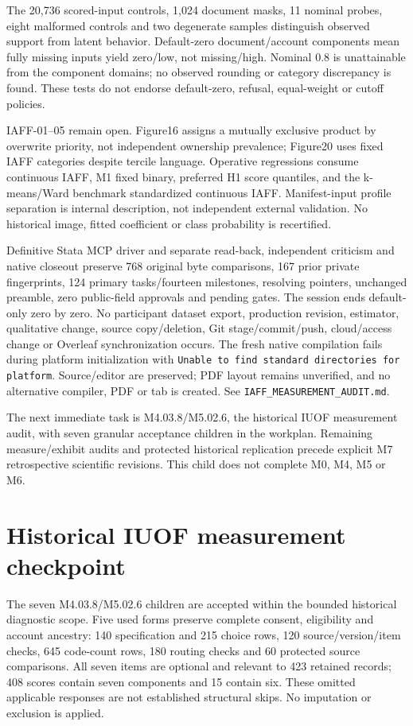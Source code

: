 \documentclass[11pt,a4paper]{article}
\begin{document}
The 20,736 scored-input controls, 1,024 document masks, 11 nominal probes,
eight malformed controls and two degenerate samples distinguish observed
support from latent behavior. Default-zero document/account components mean
fully missing inputs yield zero/low, not missing/high. Nominal 0.8 is
unattainable from the component domains; no observed rounding or category
discrepancy is found. These tests do not endorse default-zero, refusal,
equal-weight or cutoff policies.

IAFF-01--05 remain open. Figure16 assigns a mutually exclusive product by
overwrite priority, not independent ownership prevalence; Figure20 uses fixed
IAFF categories despite tercile language. Operative regressions consume
continuous IAFF, M1 fixed binary, preferred H1 score quantiles, and the
k-means/Ward benchmark standardized continuous IAFF. Manifest-input profile
separation is internal description, not independent external validation.
No historical image, fitted coefficient or class probability is recertified.

Definitive Stata MCP driver and separate read-back, independent criticism
and native closeout preserve 768 original byte comparisons, 167 prior
private fingerprints, 124 primary tasks/fourteen milestones, resolving
pointers, unchanged preamble, zero public-field approvals and pending gates.
The session ends default-only zero by zero. No participant dataset export,
production revision, estimator, qualitative change, source copy/deletion,
Git stage/commit/push, cloud/access change or Overleaf synchronization occurs.
The fresh native compilation fails during platform initialization with
\texttt{Unable to find standard directories for platform}. Source/editor
are preserved; PDF layout remains unverified, and no alternative compiler,
PDF or tab is created. See \texttt{IAFF\_MEASUREMENT\_AUDIT.md}.

The next immediate task is M4.03.8/M5.02.6, the historical IUOF measurement
audit, with seven granular acceptance children in the workplan. Remaining
measure/exhibit audits and protected historical replication precede explicit
M7 retrospective scientific revisions. This child does not complete M0,
M4, M5 or M6.


\section{Historical IUOF measurement checkpoint}
The seven M4.03.8/M5.02.6 children are accepted within the bounded
historical diagnostic scope. Five used forms preserve complete consent,
eligibility and account ancestry: 140 specification and 215 choice rows,
120 source/version/item checks, 645 code-count rows, 180 routing checks
and 60 protected source comparisons. All seven items are optional and
relevant to 423 retained records; 408 scores contain seven components and
15 contain six. These omitted applicable responses are not established
structural skips. No imputation or exclusion is applied.
\end{document}
